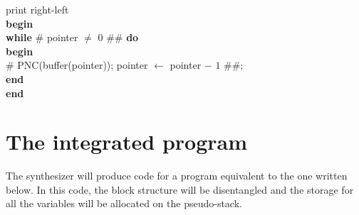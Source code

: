 \documentclass[openany,nobib]{tufte-book}
\newcommand{\kw}[1]{{\bf #1}}
\begin{document}
\bigskip
\noindent print right-left\\
\-\hspace{0.2cm} \kw{begin} \\
\-\hspace{0.4cm} \kw{while} \# pointer $\neq$ $0$ \#\# \kw{do} \\
\-\hspace{0.7cm} \kw{begin} \\
\-\hspace{1cm}  \# PNC(buffer(pointer)); pointer $\gets$ pointer $-$ $1$
\#\#;\\
\-\hspace{0.7cm} \kw{end} \\
\-\hspace{0.2cm} \kw{end}

\section{The integrated program}

The synthesizer will produce code for a program equivalent to the one written
below. In this code, the block structure will be disentangled and the storage
for all the variables will be allocated on the pseudo-stack.

\bigskip{}

\clearpage
\end{document}
